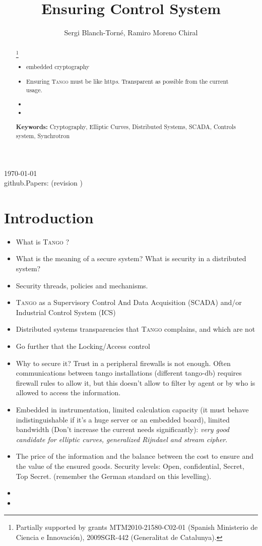 \documentclass[10pt,a4paper,twoside]{llncs}
\title{Ensuring \tango Control System}
\author{Sergi Blanch-Torn\'e\inst{1}, Ramiro Moreno Chiral\inst{2}}
\institute{
 Escola Polit\`ecnica Superior, Universitat de Lleida. Spain.\\
 \email{\tt sblanch@alumnes.udl.es}
 \and 
 Departament de Matem\`atica. Universitat de Lleida. Spain.\\
 \email{\tt ramiro@matematica.udl.es}
 }
\newcommand{\version}{github.Papers: \gitCommitterDate\;(revision \gitAbbrevHash) }
\newcommand{\tango}{\textsc{Tango} }
\begin{document}
\maketitle
\begin{center}
 \today\\
 \version
\end{center}


\begin{abstract}\footnote{Partially supported by grants MTM2010-21580-C02-01 (Spanish Ministerio de Ciencia e Innovaci\'on), 2009SGR-442 (Generalitat de Catalunya).}

\begin{itemize}
 \item embedded cryptography
 \item Ensuring \tango must be like http\emph{s}. Transparent as possible from the current usage.
 \item 
 \item 
\end{itemize}
   
{\bf Keywords:} Cryptography, Elliptic Curves, Distributed Systems, SCADA, Controls system, Synchrotron
\end{abstract}

%
\section{Introduction \label{sec:intro}}

\begin{itemize}
 \item What is \tango?
 \item What is the meaning of a secure system? What is security in a distributed system?
 \item Security threads, policies and mechanisms.
 \item \tango as a Supervisory Control And Data Acquisition (SCADA) and/or Industrial Control System (ICS)
 \item Distributed systems transparencies \cite{TanenbaumDistr} that \tango complains, and which are not
 \item Go further that the Locking/Access control
 \item Why to secure it? Trust in a peripheral firewalls is not enough. Often communications between tango installations (different tango-db) requires firewall rules to allow it, but this doesn't allow to filter by agent or by who is allowed to access the information.
 \item Embedded in instrumentation, limited calculation capacity (it must behave indistinguishable if it's a huge server or an embedded board), limited bandwidth (Don't increase the current needs significantly): \emph{very good candidate for elliptic curves, generalized Rijndael and stream cipher}.
 \item The price of the information and the balance between the cost to ensure and the value of the ensured goods. Security levels: Open, confidential, Secret, Top Secret. (remember the German standard on this levelling).
 \item 
 \item 
\end{itemize}
\end{document}

